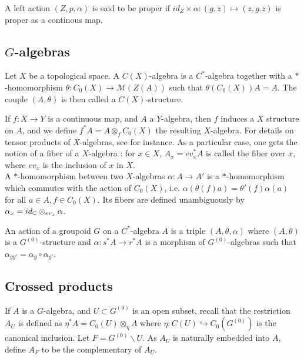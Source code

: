 A left action $(Z,p,\alpha)$ is said to be proper if $id_Z \times \alpha : (g,z) \mapsto (z,g.z) $ is proper as a continous map.\\

\subsection{$G$-algebras}

\begin{definition}
Let $X$ be a topological space. A $C(X)$-algebra is a $C^*$-algebra together with a $*$-homomorphism $\theta : C_0(X)\rightarrow \mathcal M(Z(A))$ such that $\theta (C_0(X)) A = A$. The couple $(A,\theta)$ is then called a $C(X)$-structure.
\end{definition} 

If $f : X\rightarrow Y$ is a continuous map, and $A$ a $Y$-algebra, then $f$ induces a $X$ structure on $A$, and we define $f^* A = A \otimes_f C_0(X)$ the resulting $X$-algebra. For details on tensor products of $X$-algebras, see \cite{LeGall} for instance. As a particular case, one gets the notion of a fiber of a $X$-algebra : for $x\in X$, $A_x = ev_x^* A$ is called the fiber over $x$, where $ev_x$ is the inclusion of $x$ in $X$.\\

A $*$-homomorphism between two $X$-algebras $\alpha : A\rightarrow A'$ is a $*$-homomorphism which commutes with the action of $C_0(X)$, i.e. $\alpha(\theta(f)a)=\theta'(f)\alpha(a)$ for all $a\in A,f\in C_0(X)$. Its fibers are defined unambiguously by $\alpha_x = id_\mathbb C \otimes_{ev_x} \alpha$.\\ 

\begin{definition}
An action of a groupoid $G$ on a $C^*$-algebra $A$ is a triple $(A,\theta,\alpha)$ where $(A,\theta)$ is a $G^{(0)}$-structure and $\alpha : s^* A \rightarrow r^* A$ is a morphism of $G^{(0)}$-algebras such that $\alpha_{gg'}= \alpha_g\circ \alpha_{g'}$.
\end{definition} 

\subsection{Crossed products}

If $A$ is a $G$-algebra, and $U \subset G^{(0)}$ is an open subset, recall \cite{LeGall} that the restriction $A_U$ is defined as $\eta^* A = C_0(U) \otimes_\eta A$ where $\eta : C(U) \hookrightarrow C_0(G^{(0)})$ is the canonical inclusion. Let $F= G^{(0)}\backslash U$. As $A_U$ is naturally embedded into $A$, define $A_F$ to be the complementary of $A_U$. \\

